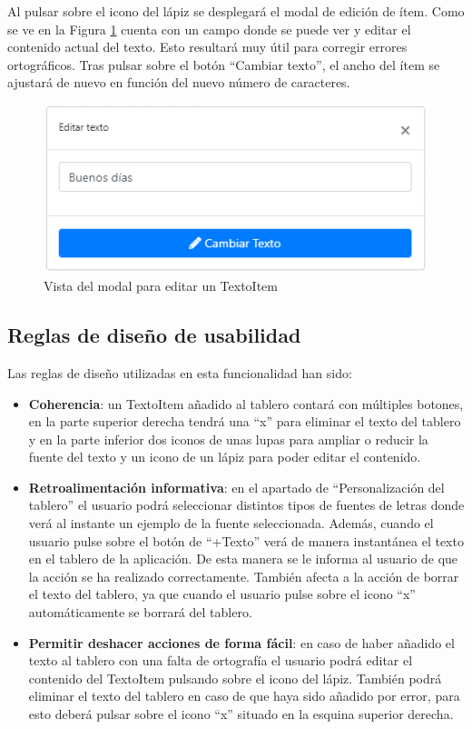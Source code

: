 Al pulsar sobre el icono del lápiz se desplegará el modal de edición de ítem. Como se ve en la Figura \ref{fig:modaleditartexto} cuenta con un campo donde se puede ver y editar el contenido actual del texto. Esto resultará muy útil para corregir errores ortográficos. Tras pulsar sobre el botón “Cambiar texto”, el ancho del ítem se ajustará de nuevo en función del nuevo número de caracteres.

\begin{figure}[h!]
	\centering
	\includegraphics[width=0.7\linewidth]{Imagenes/Bitmap/modalEditarTexto}
	\caption{Vista del modal para editar un TextoItem}
	\label{fig:modaleditartexto}
\end{figure}

\subsection{Reglas de diseño de usabilidad}

 Las reglas de diseño utilizadas en esta funcionalidad han sido:
\begin{itemize}
	\item \textbf{Coherencia}:  un TextoItem añadido al tablero contará con múltiples botones, en la parte superior derecha tendrá una “x” para eliminar el texto del tablero y en la parte inferior dos iconos de unas lupas para ampliar o reducir la fuente del texto y un icono de un lápiz para poder editar el contenido.
	
	\item \textbf{Retroalimentación informativa}: en el apartado de “Personalización del tablero” el usuario podrá seleccionar distintos tipos de fuentes de letras donde verá al instante un ejemplo de la fuente seleccionada. Además, cuando el usuario pulse sobre el botón de “+Texto” verá de manera instantánea el texto en el tablero de la aplicación. De esta manera se le informa al usuario de que la acción se ha realizado correctamente. También afecta a la acción de borrar el texto del tablero, ya que cuando el usuario pulse sobre el icono “x” automáticamente se borrará del tablero.
	
	
	\item \textbf{Permitir deshacer acciones de forma fácil}: en caso de haber añadido el texto al tablero con una falta de ortografía el usuario podrá editar el contenido del TextoItem pulsando sobre el icono del lápiz. También podrá eliminar el texto del tablero en caso de que haya sido añadido por error, para esto deberá pulsar sobre el icono “x” situado en la esquina superior derecha.
	
\end{itemize}



